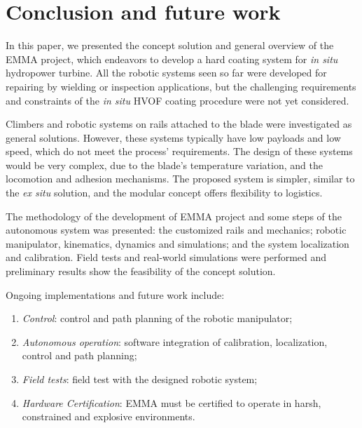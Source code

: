 \section{Conclusion and future work}

In this paper, we presented the concept solution and general overview of the
EMMA project, which endeavors to develop a hard coating system for \textit{in
situ} hydropower turbine. All the robotic systems seen so far were developed for
repairing by wielding or inspection applications, but the challenging
requirements and constraints of the \textit{in situ} HVOF coating procedure
were not yet considered. 

Climbers and robotic systems on rails attached to the blade were investigated as
general solutions. However, these systems typically have low payloads and low
speed, which do not meet the process' requirements. The design of these systems
would be very complex, due to the blade's temperature variation, and the
locomotion and adhesion mechanisms. The proposed system is simpler, similar to
the \textit{ex situ} solution, and the modular concept offers flexibility to
logistics.

The methodology of the development of EMMA project and some steps
of the autonomous system was presented: the customized rails and mechanics;
robotic manipulator, kinematics, dynamics and simulations; and the system
localization and calibration. Field tests and real-world simulations were
performed and preliminary results show the feasibility of the concept solution.

Ongoing implementations and future work include:
\begin{enumerate}
 	\item \textit{Control}: control and path planning of the robotic
 	manipulator;
  	\item \textit{Autonomous operation}: software integration of calibration,
  	localization, control and path planning;
  	\item \textit{Field tests}: field test with the designed robotic system;
  	\item \textit{Hardware Certification}: EMMA must be certified to operate in
  harsh, constrained and explosive environments.
\end{enumerate}